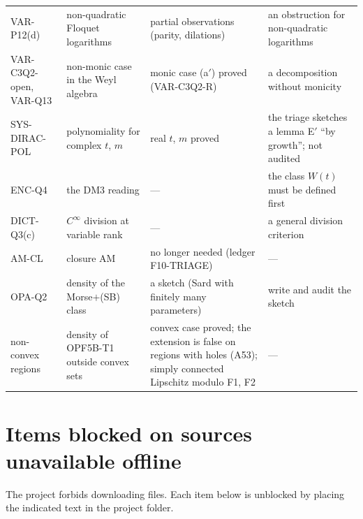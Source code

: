 \begin{center}
\begin{longtable}{@{}L{2.5cm}L{4.0cm}L{4.2cm}L{4.0cm}@{}}
VAR-P12(d) & non-quadratic Floquet logarithms & partial observations (parity, dilations) & an obstruction for non-quadratic logarithms\\
VAR-C3Q2-open, VAR-Q13 & non-monic case in the Weyl algebra & monic case (a$'$) proved (VAR-C3Q2-R) & a decomposition without monicity\\
SYS-DIRAC-POL & polynomiality for complex $t$, $m$ & real $t$, $m$ proved & the triage sketches a lemma E$'$ ``by growth''; not audited\\
ENC-Q4 & the DM3 reading & --- & the class $W(t)$ must be defined first\\
DICT-Q3(c) & $C^\infty$ division at variable rank & --- & a general division criterion\\
AM-CL & closure AM & no longer needed (ledger F10-TRIAGE) & ---\\
OPA-Q2 & density of the Morse$+$(SB) class & a sketch (Sard with finitely many parameters) & write and audit the sketch\\
non-convex regions & density of OPF5B-T1 outside convex sets & convex case proved; the extension is false on regions with holes (A53); simply connected Lipschitz modulo F1, F2 & ---\\
\bottomrule
\end{longtable}
\end{center}

\section{Items blocked on sources unavailable offline}

The project forbids downloading files. Each item below is unblocked by placing the indicated text in the project folder.

